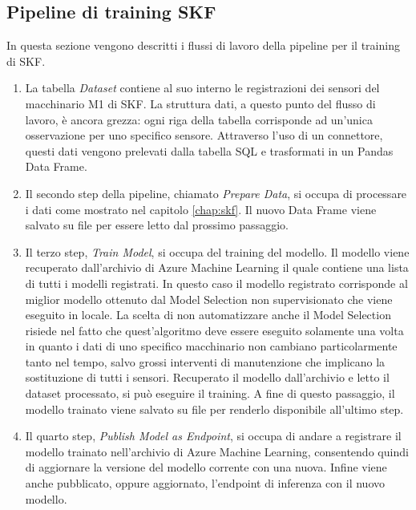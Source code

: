 \subsection{Pipeline di training SKF}
In questa sezione vengono descritti i flussi di lavoro della pipeline per il training di SKF.
\begin{enumerate}
	\item La tabella \textit{Dataset} contiene al suo interno le registrazioni dei sensori del macchinario M1 di SKF. La struttura dati, a questo punto del flusso di lavoro, è ancora grezza: ogni riga della tabella corrisponde ad un'unica osservazione per uno specifico sensore. Attraverso l'uso di un connettore, questi dati vengono prelevati dalla tabella SQL e trasformati in un Pandas Data Frame.
	\item Il secondo step della pipeline, chiamato \textit{Prepare Data}, si occupa di processare i dati come mostrato nel capitolo \ref{chap:skf}. Il nuovo Data Frame viene salvato su file per essere letto dal prossimo passaggio.
	\item Il terzo step, \textit{Train Model}, si occupa del training del modello. Il modello viene recuperato dall'archivio di Azure Machine Learning il quale contiene una lista di tutti i modelli registrati. In questo caso il modello registrato corrisponde al miglior modello ottenuto dal Model Selection non supervisionato che viene eseguito in locale. La scelta di non automatizzare anche il Model Selection risiede nel fatto che quest'algoritmo deve essere eseguito solamente una volta in quanto i dati di uno specifico macchinario non cambiano particolarmente tanto nel tempo, salvo grossi interventi di manutenzione che implicano la sostituzione di tutti i sensori. Recuperato il modello dall'archivio e letto il dataset processato, si può eseguire il training. A fine di questo passaggio, il modello trainato viene salvato su file per renderlo disponibile all'ultimo step.
	\item Il quarto step, \textit{Publish Model as Endpoint}, si occupa di andare a registrare il modello trainato nell'archivio di Azure Machine Learning, consentendo quindi di aggiornare la versione del modello corrente con una nuova. Infine viene anche pubblicato, oppure aggiornato, l'endpoint di inferenza con il nuovo modello.
\end{enumerate}


